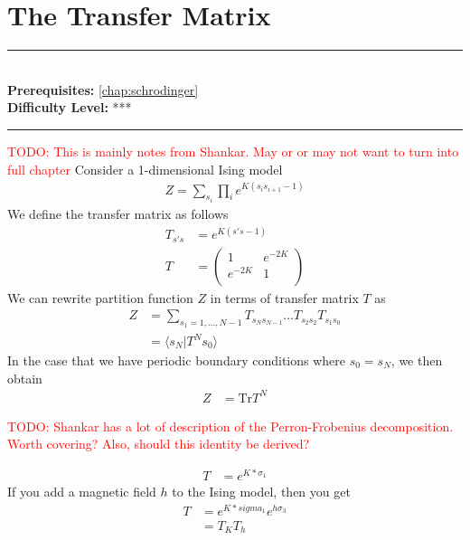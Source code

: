 \documentclass[book.tex]{subfiles}
\begin{document}
\chapter{The Transfer Matrix}

\label{chap:transfer_matrix}
\noindent\rule{11cm}{0.4pt} \\
\textbf{Prerequisites:}  \autoref{chap:schrodinger} \\
\textbf{Difficulty Level:} *** \\
\noindent\rule{11cm}{0.4pt}
\vspace{5mm}

\textcolor{red}{TODO: This is mainly notes from Shankar. May or or may not want to turn into full chapter}
Consider a 1-dimensional Ising model
\begin{align}
    Z = \sum_{s_i} \prod_i e^{K(s_i s_{i+1}-1)}
\end{align}
We define the transfer matrix as follows
\begin{align}
    T_{s's} &= e^{K(s's-1)} \\
    T &= \begin{pmatrix}
    1 & e^{-2K} \\ 
    e^{-2K} & 1 \\
    \end{pmatrix}
\end{align}
We can rewrite partition function $Z$ in terms of transfer matrix $T$ as
\begin{align}
    Z &= \sum_{s_1=1,\dotsc,N-1} T_{s_Ns_{N-1}}\dotsc T_{s_2s_2}T_{s_1s_0} \\
    &= \langle s_N | T^N s_0 \rangle
\end{align}
In the case that we have periodic boundary conditions where $s_0 = s_N$, we then obtain
\begin{align}
    Z &= \mathrm{Tr} T^N
\end{align}

\textcolor{red}{TODO: Shankar has a lot of description of the Perron-Frobenius decomposition. Worth covering? Also, should this identity be derived?}

\begin{align}
    T &= e^{K*\sigma_1}
\end{align}
If you add a magnetic field $h$ to the Ising model, then you get
\begin{align}
    T&= e^{K*sigma_1}e^{h\sigma_3} \\
    &= T_K T_h
\end{align} 
\end{document}
